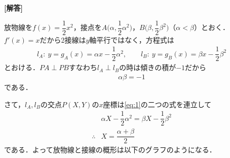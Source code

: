 \documentclass[../../main.tex]{subfiles}
\begin{document}
\begin{oframed}
  
\end{oframed}

{\bf [解答]}

放物線を$f(x)=\dfrac{1}{2}x^2$，接点を$A\bigl(\alpha,\dfrac{1}{2}\alpha^2\bigr)$，$B\bigl(\beta,\dfrac{1}{2}\beta^2\bigr)$（$\alpha<\beta$）とおく．$f'(x)=x$だから2接線は$y$軸平行ではなく，方程式は
\begin{align}
  l_A:\ y=g_A(x)=\alpha x-\dfrac{1}{2}\alpha^2,\qquad l_B:\ y=g_B(x)=\beta x-\dfrac{1}{2}\beta^2 \label{eq:1}
\end{align}
とおける．$PA\perp PB$すなわち$l_A\perp l_B$の時は傾きの積が$-1$だから
\begin{align}
  \alpha\beta=-1 \label{eq:2}
\end{align}
である．

さて，$l_A,l_B$の交点$P(X,Y)$の$x$座標は\cref{eq:1}の二つの式を連立して
\begin{align}
  & \alpha X-\dfrac{1}{2}\alpha^2=\beta X-\dfrac{1}{2}\beta^2 \\
  \therefore
  & X = \dfrac{\alpha+\beta}{2} \label{eq:3}
\end{align}
である．よって放物線と接線の概形は以下のグラフのようになる．
\end{document}
